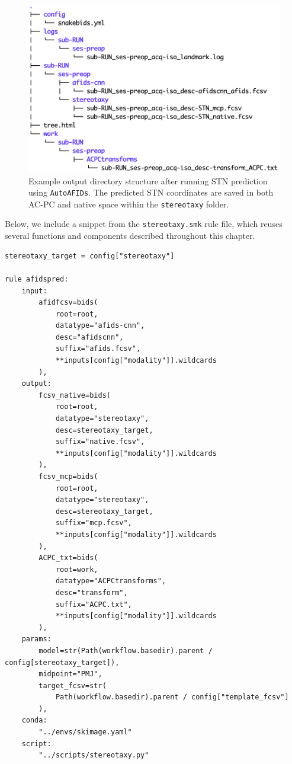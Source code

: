 \begin{figure}[hbt!]
    \includegraphics[width=0.7\linewidth]{figs/output_directory_structure.png}
    \caption{Example output directory structure after running STN prediction using \texttt{AutoAFIDs}. The predicted STN coordinates are saved in both AC-PC and native space within the \texttt{stereotaxy} folder.}
    \label{fig:fidsoutputspred}
\end{figure}


Below, we include a snippet from the \texttt{stereotaxy.smk} rule file, which reuses several functions and components described throughout this chapter.


\begin{verbatim}
stereotaxy_target = config["stereotaxy"]

rule afidspred:
    input:
        afidfcsv=bids(
            root=root,
            datatype="afids-cnn",
            desc="afidscnn",
            suffix="afids.fcsv",
            **inputs[config["modality"]].wildcards
        ),
    output:
        fcsv_native=bids(
            root=root,
            datatype="stereotaxy",
            desc=stereotaxy_target,
            suffix="native.fcsv",
            **inputs[config["modality"]].wildcards
        ),
        fcsv_mcp=bids(
            root=root,
            datatype="stereotaxy",
            desc=stereotaxy_target,
            suffix="mcp.fcsv",
            **inputs[config["modality"]].wildcards
        ),
        ACPC_txt=bids(
            root=work,
            datatype="ACPCtransforms",
            desc="transform",
            suffix="ACPC.txt",
            **inputs[config["modality"]].wildcards
        ),
    params:
        model=str(Path(workflow.basedir).parent / config[stereotaxy_target]),
        midpoint="PMJ",
        target_fcsv=str(
            Path(workflow.basedir).parent / config["template_fcsv"]
        ),
    conda:
        "../envs/skimage.yaml"
    script:
        "../scripts/stereotaxy.py"
\end{verbatim}